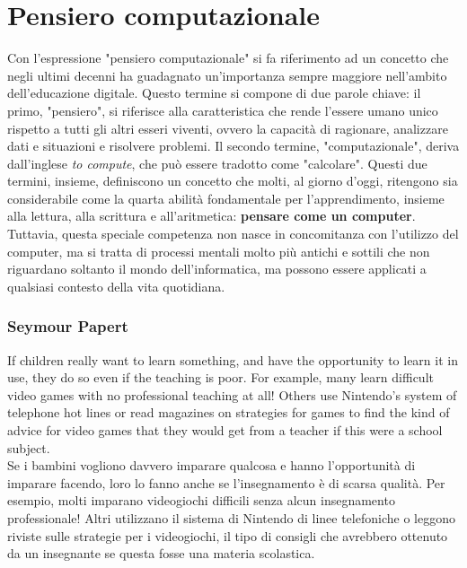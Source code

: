 \section{Pensiero computazionale}
Con l'espressione "pensiero computazionale" si fa riferimento ad un concetto che negli ultimi decenni ha guadagnato un'importanza sempre maggiore nell'ambito dell'educazione digitale. Questo termine si compone di due parole chiave: 
il primo, "pensiero", si riferisce alla caratteristica che rende l'essere umano unico rispetto a tutti gli altri esseri viventi, ovvero la capacità di ragionare, analizzare dati e situazioni e 
risolvere problemi. Il secondo termine, "computazionale", deriva dall'inglese \textit{to compute}, che può essere tradotto come "calcolare". Questi due termini, insieme, definiscono un concetto 
che molti, al giorno d'oggi, ritengono sia considerabile come la quarta abilità fondamentale per l'apprendimento, insieme alla lettura, alla scrittura e all'aritmetica: \textbf{pensare come un computer}.
Tuttavia, questa speciale competenza non nasce in concomitanza con l'utilizzo del computer, ma si tratta di processi mentali molto più antichi e sottili che non riguardano soltanto il mondo 
dell'informatica, ma possono essere applicati a qualsiasi contesto della vita quotidiana. 

\subsubsection{Seymour Papert}\label{papert}

\begin{multicols}{2}
    If children really want to learn something, and have the opportunity to learn it in use, they
    do so even if the teaching is poor. For example, many learn
    difficult video games with no professional teaching at all! Others
    use Nintendo's system of telephone hot lines or read magazines
    on strategies for games to find the kind of advice for video games
    that they would get from a teacher if this were a school subject.\newline
    \\
    Se i bambini vogliono davvero imparare qualcosa e hanno l'opportunità di imparare facendo, loro lo fanno anche se l'insegnamento è di scarsa qualità. Per esempio, molti imparano
    videogiochi difficili senza alcun insegnamento professionale! Altri
    utilizzano il sistema di Nintendo di linee telefoniche o leggono riviste
    sulle strategie per i videogiochi, il tipo di consigli
    che avrebbero ottenuto da un insegnante se questa fosse una materia scolastica.
  \end{multicols}

